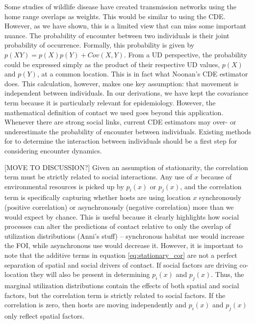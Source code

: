 \documentclass[letterpaper]{article}
\begin{document}






Some studies of wildlife disease have created transmission networks using the home range overlaps as weights. This would be similar to using the CDE.
However, as we have shown, this is a limited view that can miss some important nuance.
The probability of encounter between two individuals is their joint probability of occurrence.  Formally, this probability is given by $p(XY)=p(X)p(Y)+Cov(X,Y)$. From a UD perspective, the probability could be expressed simply as the product of their respective UD values, $p(X)$ and $p(Y)$, at a common location. %
This is in fact what Noonan's CDE estimator does. This calculation, however, makes one key assumption: that movement is independent between individuals. 
In our derivations, we have kept the covariance term because it is particularly relevant for epidemiology. However, the mathematical definition of contact we used goes beyond this application.  Whenever there are strong social links, current CDE estimators may over- or underestimate the probability of encounter between individuals. 
Existing methods for to determine the interaction between individuals \citep{Scharf2018} should be a first step for considering encounter dynamics. 

[MOVE TO DISCUSSION?] Given an assumption of stationarity, the correlation term must be strictly related to social interactions.  Any use of $x$ because of environmental resources is picked up by $p_i(x)$ or $p_j(x)$, and the correlation term is specifically capturing whether hosts are using location $x$ synchronously (positive correlation) or asynchronously (negative correlation) more than we would expect by chance.  This is useful because it clearly highlights how social processes can alter the predictions of contact relative to only the overlap of utilization distributions (Anni's stuff) -- synchronous habitat use would increase the FOI, while asynchronous use would decrease it. However, it is important to note that the additive terms in equation \ref{eq:stationary_cor} are not a perfect separation of spatial and social drivers of contact. If social factors are driving co-location they will also be present in determining $p_i(x)$ and $p_j(x)$. Thus, the marginal utilization distributions contain the effects of both spatial and social factors, but the correlation term is strictly related to social factors.  If the correlation is zero, then hosts are moving independently and $p_i(x)$ and $p_j(x)$ only reflect spatial factors.
\end{document}
